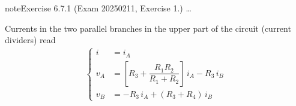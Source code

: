 \documentclass[letterpaper,10pt,english]{jupyterBook}
\begin{document}
\begin{sphinxadmonition}{note}{Exercise 6.7.1 (Exam 2025\sphinxhyphen{}02\sphinxhyphen{}11, Exercise 1.)}
\sphinxAtStartPar
{} …



\sphinxAtStartPar
Currents in the two parallel branches in the upper part of the circuit (current dividers) read
\begin{equation*}
\begin{split}\begin{cases}
  i   & = i_A \\
  v_A & = \left[ R_3 + \dfrac{R_1 R_2}{R_1 + R_2} \right] \, i_A - R_3 \, i_B \\
  v_B & = -R_3 \, i_A + (R_3 + R_4) \, i_B
\end{cases}\end{split}
\end{equation*}
\begin{figure}[htbp]
\centering

\noindent{}
\end{figure}


\end{sphinxadmonition}
\end{document}
